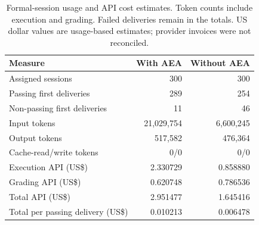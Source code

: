 \begin{table}[!htbp]
\centering\small
\caption{Formal-session usage and API cost estimates. Token counts include execution and grading. Failed deliveries remain in the totals. US dollar values are usage-based estimates; provider invoices were not reconciled.}
\label{tab:paired-costs}
\begin{tabular}{lrr}
\toprule
Measure & With AEA & Without AEA \\
\midrule
Assigned sessions & 300 & 300 \\
Passing first deliveries & 289 & 254 \\
Non-passing first deliveries & 11 & 46 \\
Input tokens & 21,029,754 & 6,600,245 \\
Output tokens & 517,582 & 476,364 \\
Cache-read/write tokens & 0/0 & 0/0 \\
Execution API (US\$) & 2.330729 & 0.858880 \\
Grading API (US\$) & 0.620748 & 0.786536 \\
Total API (US\$) & 2.951477 & 1.645416 \\
Total per passing delivery (US\$) & 0.010213 & 0.006478 \\
\bottomrule
\end{tabular}
\end{table}
